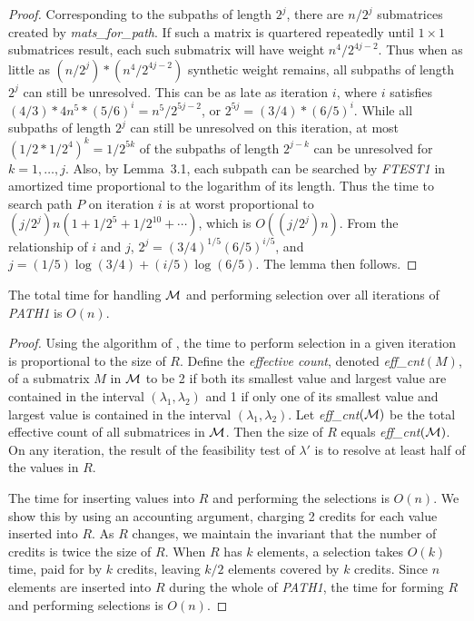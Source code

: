 {{{\begin{proof}
Corresponding to the subpaths of length $2^j$,
there are $n/2^j$ submatrices created by {\it mats\_for\_path}.
If such a matrix is quartered repeatedly until $1 \times 1$ submatrices result,
each such submatrix will have weight $n^4/2^{4j-2}$.
Thus when as little as $(n/2^j)*(n^4/2^{4j-2})$ synthetic weight remains,
all subpaths of length $2^j$ can still be unresolved.
This can be as late as iteration $i$,
where $i$ satisfies
$(4/3)*4n^5*(5/6)^i = n^5/2^{5j-2}$,
or $2^{5j}=(3/4)*(6/5)^i$.
While all subpaths of length $2^j$ can still be unresolved on this iteration,
at most $(1/2*1/2^4)^k = 1/2^{5k}$ of the subpaths of length $2^{j-k}$
can be unresolved for $k= 1, \ldots, j$.
Also, by Lemma~3.1, each subpath can be searched by {\it FTEST1}
in amortized time proportional to the logarithm of its length.
Thus the time to search path $P$ on iteration $i$ is at worst proportional to
$(j/2^j)n(1 + 1/2^5 + 1/2^{10} + \cdots )$,
which is $O((j/2^j)n)$.
From the relationship of $i$ and $j$,
$2^j = (3/4)^{1/5}(6/5)^{i/5}$,
and $j = (1/5)\log(3/4) + (i/5)\log (6/5)$.
The lemma then follows.
\end{proof}

\begin{lemma}
\label{lem:3:3}
The total time for handling $\cal M$ and
performing selection over all iterations of {\it PATH1} is $O(n)$.
\end{lemma}
\begin{proof}
Using the algorithm of \cite{BFPRT},
the time to perform selection in a given iteration
is proportional to the size of $R$.
Define the {\it effective count}, denoted {\it eff\_cnt}$(M)$,
of a submatrix $M$ in $\cal M$ to be
2 if both its smallest value and largest value
are contained in the interval $(\lambda_1, \lambda_2)$
and 1 if only one of its smallest value and largest value
is contained in the interval $(\lambda_1, \lambda_2)$.
Let {\it eff\_cnt}$(\cal M )$ be the total effective count
of all submatrices in $\cal M$.
Then the size of $R$ equals {\it eff\_cnt}$(\cal M )$.
On any iteration, the result of the feasibility test of $\lambda '$
is to resolve at least half of the values in $R$.

The time for inserting values into $R$ and performing the selections is $O(n)$.
We show this by using an accounting argument, charging 2 credits for each value
inserted into $R$. As $R$ changes, we maintain the invariant that the number
of credits is twice the size of $R$. When $R$ has $k$ elements,
a selection takes $O(k)$ time, paid for by $k$ credits, leaving $k/2$ elements
covered by $k$ credits. Since $n$ elements are inserted into $R$ during the whole of
{\it PATH1}, the time for forming $R$ and performing selections is $O(n)$.


\end{proof}}}}
